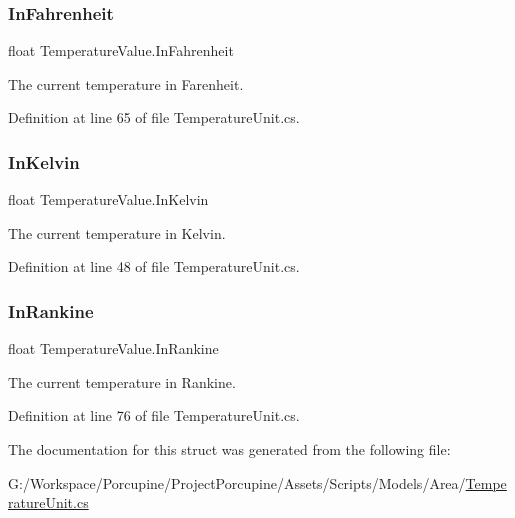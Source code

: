 \subsubsection{\texorpdfstring{In\+Fahrenheit}{InFahrenheit}}
{\footnotesize\ttfamily float Temperature\+Value.\+In\+Fahrenheit\hspace{0.3cm}{\ttfamily [get]}}



The current temperature in Farenheit. 



Definition at line 65 of file Temperature\+Unit.\+cs.

\mbox{\label{struct_temperature_value_a7ca4eabfab106e1cf112128ae7d63642}} 
\subsubsection{\texorpdfstring{In\+Kelvin}{InKelvin}}
{\footnotesize\ttfamily float Temperature\+Value.\+In\+Kelvin\hspace{0.3cm}{\ttfamily [get]}}



The current temperature in Kelvin. 



Definition at line 48 of file Temperature\+Unit.\+cs.

\mbox{\label{struct_temperature_value_ad4ddd17eb8022c74e9e905364aa06566}} 
\subsubsection{\texorpdfstring{In\+Rankine}{InRankine}}
{\footnotesize\ttfamily float Temperature\+Value.\+In\+Rankine\hspace{0.3cm}{\ttfamily [get]}}



The current temperature in Rankine. 



Definition at line 76 of file Temperature\+Unit.\+cs.



The documentation for this struct was generated from the following file\+:\begin{DoxyCompactItemize}
\item 
G\+:/\+Workspace/\+Porcupine/\+Project\+Porcupine/\+Assets/\+Scripts/\+Models/\+Area/\hyperlink{_temperature_unit_8cs}{Temperature\+Unit.\+cs}\end{DoxyCompactItemize}
